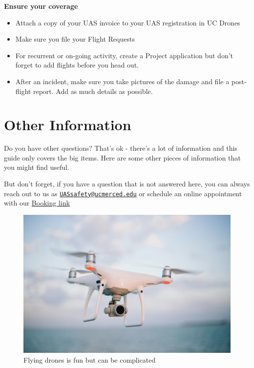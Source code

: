 \documentclass[
  12pt,
]{book}
\providecommand{\tightlist}{%
  \setlength{\itemsep}{0pt}\setlength{\parskip}{0pt}}
\begin{document}
\textbf{Ensure your coverage}

\begin{itemize}
\tightlist
\item
  Attach a copy of your UAS invoice to your UAS registration in UC Drones
\item
  Make sure you file your Flight Requests
\item
  For recurrent or on-going activity, create a Project application but don't forget to add flights before you head out.
\item
  After an incident, make sure you take pictures of the damage and file a post-flight report. Add as much details as possible.
\end{itemize}

\hypertarget{other-information}{%
\chapter{Other Information}\label{other-information}}

Do you have other questions? That's ok - there's a lot of information and this guide only covers the big items. Here are some other pieces of information that you might find useful.

But don't forget, if you have a question that is not answered here, you can always reach out to us as \href{mailto:UASsafety@ucmerced.edu}{\nolinkurl{UASsafety@ucmerced.edu}} or schedule an online appointment with our \href{https://outlook.office365.com/owa/calendar/UCCenterofExcellenceonUASSafety@merced.onmicrosoft.com/bookings/}{Booking link}

\begin{figure}

{\centering \includegraphics[width=0.75\linewidth]{images/phantom_1} 

}

\caption{Flying drones is fun but can be complicated}\label{fig:drone2}
\end{figure}
\end{document}
